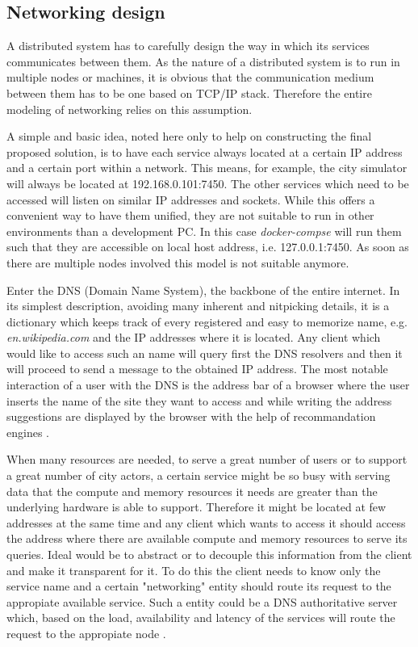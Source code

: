 \documentclass[conference]{IEEEtran}
\begin{document}
\subsection{Networking design}
\label{subsec:networking}

A distributed system has to carefully design the way in which its services communicates between them. As the nature of a distributed system is to run in multiple nodes or machines, it is obvious that the communication medium between them has to be one based on TCP/IP stack. Therefore the entire modeling of networking relies on this assumption.

A simple and basic idea, noted here only to help on constructing the final proposed solution, is to have each service always located at a certain IP address and a certain port within a network. This means, for example, the city simulator will always be located at 192.168.0.101:7450. The other services which need to be accessed will listen on similar IP addresses and sockets. While this offers a convenient way to have them unified, they are not suitable to run in other environments than a development PC. In this case \textit{docker-compse} will run them such that they are accessible on local host address, i.e. 127.0.0.1:7450. As soon as there are multiple nodes involved this model is not suitable anymore.

Enter the DNS (Domain Name System), the backbone of the entire internet. In its simplest description, avoiding many inherent and nitpicking details, it is a dictionary which keeps track of every registered and easy to memorize name, e.g. \textit{en.wikipedia.com} and the IP addresses where it is located. Any client which would like to access such an name will query first the DNS resolvers and then it will proceed to send a message to the obtained IP address. The most notable interaction of a user with the DNS is the address bar of a browser where the user inserts the name of the site they want to access and while writing the address suggestions are displayed by the browser with the help of recommandation engines \cite{risley2001domain}.

When many resources are needed, to serve a great number of users or to support a great number of city actors, a certain service might be so busy with serving data that the compute and memory resources it needs are greater than the underlying hardware is able to support. Therefore it might be located at few addresses at the same time and any client which wants to access it should access the address where there are available compute and memory resources to serve its queries. Ideal would be to abstract or to decouple this information from the client and make it transparent for it. To do this the client needs to know only the service name and a certain "networking" entity should route its request to the appropiate available service. Such a entity could be a DNS authoritative server which, based on the load, availability and latency of the services will route the request to the appropiate node \cite{swildens2006scalable}.
\end{document}
